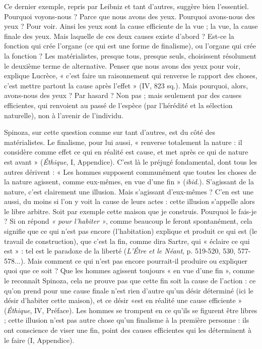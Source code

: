 Ce dernier exemple, repris par Leibniz et tant d’autres, suggère bien l’essentiel.
Pourquoi voyons-nous ? Parce que nous avons des yeux. Pourquoi avons-nous
des yeux ? Pour voir. Ainsi les yeux sont la cause efficiente de la vue ; la
vue, la cause finale des yeux. Mais laquelle de ces deux causes existe d’abord ?
Est-ce la fonction qui crée l’organe (ce qui est une forme de finalisme), ou
l'organe qui crée la fonction ? Les matérialistes, presque tous, presque seuls,
choisissent résolument le deuxième terme de alternative. Penser que nous
avons des yeux pour voir, explique Lucrèce, « c’est faire un raisonnement qui
renverse le rapport des choses, c’est mettre partout la cause après l’effet » (IV,
823 sq.). Mais pourquoi, alors, avons-nous des yeux ? Par hasard ? Non pas ;
mais seulement par des causes efficientes, qui renvoient au passé de l’espèce
(par l’hérédité et la sélection naturelle), non à l’avenir de l’individu.

Spinoza, sur cette question comme sur tant d’autres, est du côté des matérialistes.
Le finalisme, pour lui aussi, « renverse totalement la nature : il considère
comme effet ce qui en réalité est cause, et met après ce qui de nature est
avant » ({\it Éthique}, I, Appendice). C’est là le préjugé fondamental, dont tous les
autres dérivent : « Les hommes supposent communément que toutes les choses
de la nature agissent, comme eux-mêmes, en vue d’une fin » ({\it ibid.}). S'agissant
de la nature, c’est clairement une illusion. Mais s'agissant d’eux-mêmes ? C'en
est une aussi, du moins si l’on y voit la cause de leurs actes : cette illusion
s'appelle alors le libre arbitre. Soit par exemple cette maison que je construis.
Pourquoi le fais-je ? Si on répond {\it « pour l'habiter »}, comme beaucoup le feront
spontanément, cela signifie que ce qui n’est pas encore (l’habitation) explique
et produit ce qui est (le travail de construction), que c’est la fin, comme dira
Sartre, qui « éclaire ce qui est » : tel est le paradoxe de la liberté ({\it L'Étre et le
Néant}, p. 519-520, 530, 577-578...). Mais comment ce qui n’est pas encore
pourrait-il produire ou expliquer quoi que ce soit ? Que les hommes agissent
toujours « en vue d’une fin », comme le reconnaît Spinoza, cela ne prouve pas
que cette fin soit la cause de l’action : ce qu’on prend pour une cause finale
n’est rien d’autre qu’un désir déterminé (ici le désir d’habiter cette maison),
et ce désir «est en réalité une cause efficiente » ({\it Éthique}, IV, Préface). Les
hommes se trompent en ce qu’ils se figurent être libres ; cette illusion n’est
pas autre chose qu’un finalisme à la première personne : ils ont conscience de
viser une fin, point des causes efficientes qui les déterminent à le faire
(I, Appendice).

